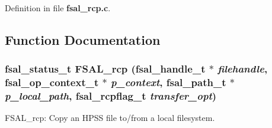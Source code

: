 Definition in file {\bf fsal\_\-rcp.c}.

\subsection{Function Documentation}
\subsubsection{\setlength{\rightskip}{0pt plus 5cm}fsal\_\-status\_\-t FSAL\_\-rcp (fsal\_\-handle\_\-t $\ast$ {\em filehandle}, fsal\_\-op\_\-context\_\-t $\ast$ {\em p\_\-context}, fsal\_\-path\_\-t $\ast$ {\em p\_\-local\_\-path}, fsal\_\-rcpflag\_\-t {\em transfer\_\-opt})}\label{fsal__rcp_8c_a1}


FSAL\_\-rcp: Copy an HPSS file to/from a local filesystem.

